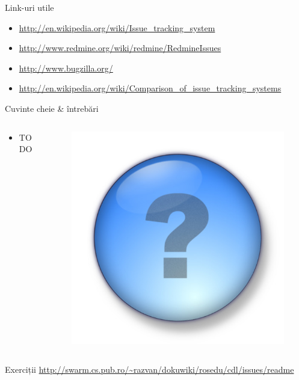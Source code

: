 \documentclass{beamer}
\begin{document}
\begin{frame}{Link-uri utile}
  \begin{itemize}
    \item \url{http://en.wikipedia.org/wiki/Issue\_tracking\_system}
    \item \url{http://www.redmine.org/wiki/redmine/RedmineIssues}
    \item \url{http://www.bugzilla.org/}
    \item
\url{http://en.wikipedia.org/wiki/Comparison\_of\_issue\_tracking\_systems}
  \end{itemize}
\end{frame}

\begin{frame}{Cuvinte cheie \& întrebări}
  \begin{columns}
    \begin{column}[l]{0.5\textwidth}
      \begin{itemize}
        \item TODO
      \end{itemize}
    \end{column}
    \begin{column}[c]{0.5\textwidth}
      \begin{figure}
        \pause \includegraphics[scale=0.4]{img/question-mark.jpg}
      \end{figure}
    \end{column}
  \end{columns}
\end{frame}

\begin{frame}{Exerciții}
  \footnotesize \url{http://swarm.cs.pub.ro/~razvan/dokuwiki/rosedu/cdl/issues/readme}
\end{frame}
\end{document}
